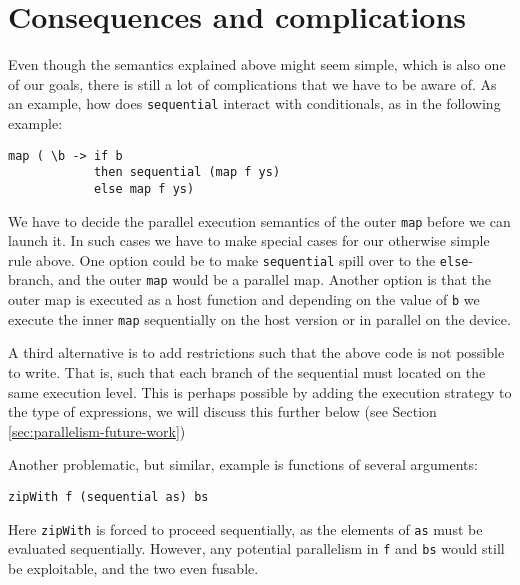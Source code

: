 \section{Consequences and complications}
\label{sec:sequential-complications}

Even though the semantics explained above might seem simple, which is
also one of our goals, there is still a lot of complications that we
have to be aware of. As an example, how does \lstinline{sequential}
interact with conditionals, as in the following example:
\begin{lstlisting}
map ( \b -> if b
            then sequential (map f ys)
            else map f ys)
\end{lstlisting}
We have to decide the parallel execution semantics of the outer
\lstinline{map} before we can launch it. In such cases we have to make
special cases for our otherwise simple rule above. One option could be
to make \lstinline{sequential} spill over to the
\lstinline{else}-branch, and the outer \lstinline{map} would be a
parallel map. Another option is that the outer map is executed as a
host function and depending on the value of \lstinline{b} we
execute the inner \lstinline{map} sequentially on the host version or
in parallel on the device.

A third alternative is to add restrictions such that the above code is
not possible to write. That is, such that each branch of the
sequential must located on the same execution level. This is perhaps
possible by adding the execution strategy to the type of expressions,
we will discuss this further below (see Section \ref{sec:parallelism-future-work})

Another problematic, but similar, example is functions of several arguments:
\begin{lstlisting}
zipWith f (sequential as) bs
\end{lstlisting}

Here \lstinline{zipWith} is forced to proceed sequentially, as the elements of
\lstinline{as} must be evaluated sequentially. However, any potential
parallelism in \lstinline{f} and \lstinline{bs} would still be exploitable,
and the two even fusable.

